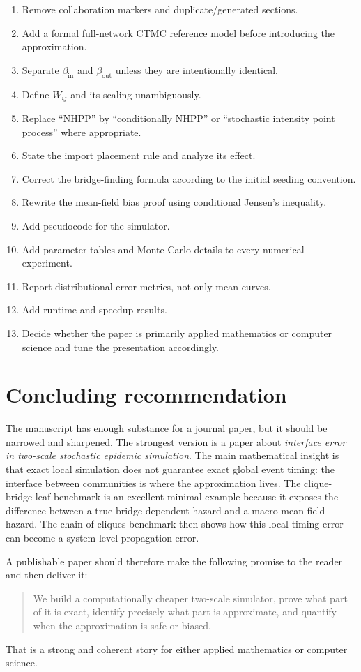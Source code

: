 \documentclass[12pt,a4paper]{article}
\theoremstyle{definition}
\newcommand{\1}{\mathbf{1}}
\begin{document}
\begin{tcolorbox}[colback=gray!5,colframe=gray!60,title=Revision checklist]
\begin{enumerate}
    \item Remove collaboration markers and duplicate/generated sections.
    \item Add a formal full-network CTMC reference model before introducing the approximation.
    \item Separate $\beta_{\mathrm{in}}$ and $\beta_{\mathrm{out}}$ unless they are intentionally identical.
    \item Define $W_{ij}$ and its scaling unambiguously.
    \item Replace ``NHPP'' by ``conditionally NHPP'' or ``stochastic intensity point process'' where appropriate.
    \item State the import placement rule and analyze its effect.
    \item Correct the bridge-finding formula according to the initial seeding convention.
    \item Rewrite the mean-field bias proof using conditional Jensen's inequality.
    \item Add pseudocode for the simulator.
    \item Add parameter tables and Monte Carlo details to every numerical experiment.
    \item Report distributional error metrics, not only mean curves.
    \item Add runtime and speedup results.
    \item Decide whether the paper is primarily applied mathematics or computer science and tune the presentation accordingly.
\end{enumerate}
\end{tcolorbox}

\section{Concluding recommendation}

The manuscript has enough substance for a journal paper, but it should be narrowed and sharpened.  The strongest version is a paper about \emph{interface error in two-scale stochastic epidemic simulation}.  The main mathematical insight is that exact local simulation does not guarantee exact global event timing: the interface between communities is where the approximation lives.  The clique-bridge-leaf benchmark is an excellent minimal example because it exposes the difference between a true bridge-dependent hazard and a macro mean-field hazard.  The chain-of-cliques benchmark then shows how this local timing error can become a system-level propagation error.

A publishable paper should therefore make the following promise to the reader and then deliver it:
\begin{quote}
We build a computationally cheaper two-scale simulator, prove what part of it is exact, identify precisely what part is approximate, and quantify when the approximation is safe or biased.
\end{quote}

That is a strong and coherent story for either applied mathematics or computer science.
\end{document}
